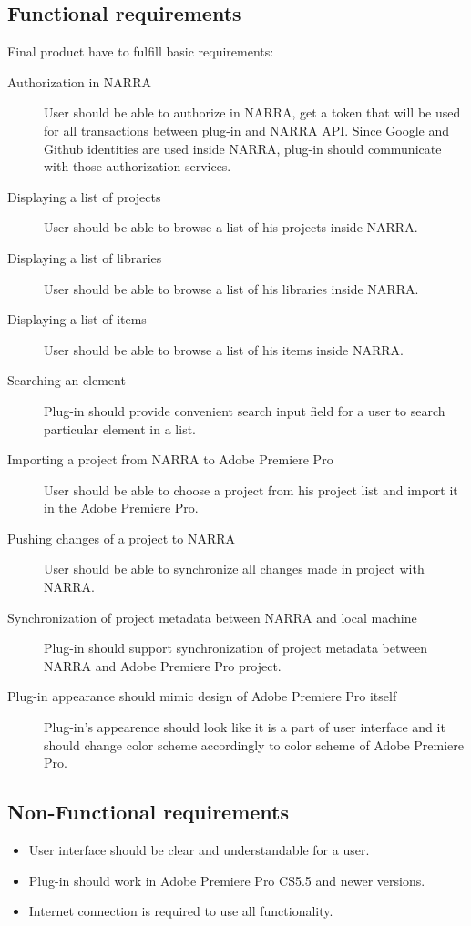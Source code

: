 \documentclass[thesis=B,english]{FITthesis}[2012/10/20]
\begin{document}
\subsection{Functional requirements}
Final product have to fulfill basic requirements:
	\begin{description}
		\item [Authorization in NARRA] 
User should be able to authorize in NARRA, get a token that will be used for all transactions between plug-in and NARRA API. Since Google and Github identities are used inside NARRA, plug-in should communicate with those authorization services.
		\item [Displaying a list of projects]
User should be able to browse a list of his projects inside NARRA.
		\item [Displaying a list of libraries]
User should be able to browse a list of his libraries inside NARRA.
		\item [Displaying a list of items]
User should be able to browse a list of his items inside NARRA.
		\item [Searching an element]
Plug-in should provide convenient search input field for a user to search particular element in a list.
		\item [Importing a project from NARRA to Adobe Premiere Pro]
User should be able to choose a project from his project list and import it in the Adobe Premiere Pro.
		\item [Pushing changes of a project to NARRA]
User should be able to synchronize all changes made in project with NARRA.
		\item [Synchronization of project metadata between NARRA and local machine]
Plug-in should support synchronization of project metadata between NARRA and Adobe Premiere Pro project.
		\item [Plug-in appearance should mimic design of Adobe Premiere Pro itself]
Plug-in's appearence should look like it is a part of user interface and it should change color scheme accordingly to color scheme of Adobe Premiere Pro.
	\end{description}
\subsection{Non-Functional requirements}
	\begin{itemize}
		\item User interface should be clear and understandable for a user.
		\item Plug-in should work in Adobe Premiere Pro CS5.5 and newer versions.
		\item Internet connection is required to use all functionality.
	\end{itemize}
\end{document}
